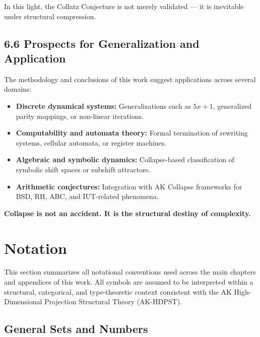 \documentclass[11pt]{article}
\begin{document}
In this light, the Collatz Conjecture is not merely validated — it is inevitable under structural compression.

\subsection{6.6 Prospects for Generalization and Application}

The methodology and conclusions of this work suggest applications across several domains:

\begin{itemize}
  \item \textbf{Discrete dynamical systems:}  
    Generalizations such as \( 5x+1 \), generalized parity mappings, or non-linear iterations.

  \item \textbf{Computability and automata theory:}  
    Formal termination of rewriting systems, cellular automata, or register machines.

  \item \textbf{Algebraic and symbolic dynamics:}  
    Collapse-based classification of symbolic shift spaces or subshift attractors.

  \item \textbf{Arithmetic conjectures:}  
    Integration with AK Collapse frameworks for BSD, RH, ABC, and IUT-related phenomena.
\end{itemize}

\begin{center}
\textbf{Collapse is not an accident. It is the structural destiny of complexity.}
\end{center}



\section*{Notation}

This section summarizes all notational conventions used across the main chapters and appendices of this work. All symbols are assumed to be interpreted within a structural, categorical, and type-theoretic context consistent with the AK High-Dimensional Projection Structural Theory (AK-HDPST).

\subsection*{General Sets and Numbers}
\end{document}
